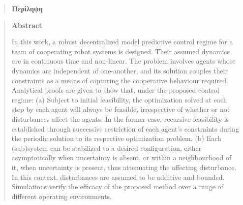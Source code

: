 
\begin{quotation}
\begin{center}
\textbf{Περίληψη}
\end{center}
\noindent
\end{quotation}



\begin{quotation}
\begin{center}
\textbf{Abstract}
\end{center}
\noindent
In this work, a robust decentralized model predictive control regime for a team
of cooperating robot systems is designed. Their assumed dynamics are
in continuous time and non-linear. The problem involves agents whose dynamics
are independent of one-another, and its solution couples their constraints as a
means of capturing the cooperative behaviour required.
Analytical proofs are given to show that, under the proposed control regime:
(a) Subject to initial feasibility, the optimization solved at each step
by each agent will always be feasible, irrespective of whether or not
disturbances affect the agents. In the former case, recursive feasibility is
established through successive restriction of each agent's constraints during
the periodic solution to its respective optimization problem.
(b) Each (sub)system can be stabilized to a desired configuration, either
asymptotically when uncertainty is absent, or within a neighbourhood of it, when
uncertainty is present, thus attenuating the affecting disturbance.
In this context, disturbances are assumed to be additive and bounded.
Simulations verify the efficacy of the proposed method over a range of different
operating environments.
\end{quotation}

\restoregeometry
{}
